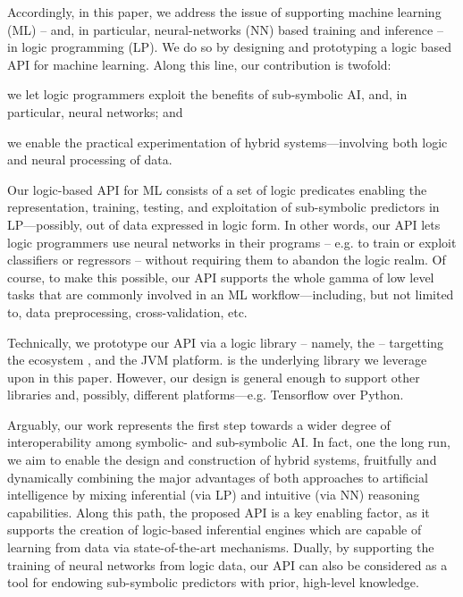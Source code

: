 \documentclass[runningheads]{llncs}
\begin{document}
Accordingly, in this paper, we address the issue of supporting machine learning (ML) -- and, in particular, neural-networks (NN) based training and inference -- in logic programming (LP).
%
We do so by designing and prototyping a logic based API for machine learning.
%
Along this line, our contribution is twofold:
%
\begin{inlinelist}
    \item we let logic programmers exploit the benefits of sub-symbolic AI, and, in particular, neural networks; and
    \item we enable the practical experimentation of hybrid systems---involving both logic and neural processing of data.
\end{inlinelist}

Our logic-based API for ML consists of a set of logic predicates enabling the representation, training, testing, and exploitation of sub-symbolic predictors in LP---possibly, out of data expressed in logic form.
%
In other words, our API lets logic programmers use neural networks in their programs -- e.g. to train or exploit classifiers or regressors -- without requiring them to abandon the logic realm.
%
Of course, to make this possible, our API supports the whole gamma of low level tasks that are commonly involved in an ML workflow---including, but not limited to, data preprocessing, cross-validation, etc.

Technically, we prototype our API via a logic library -- namely, the \mllib{} -- targetting the \twopkt{} ecosystem \cite{2p-kt}, and the JVM platform.
%
\deeplearningforj{} \cite{DL4J} is the underlying library we leverage upon in this paper.
%
However, our design is general enough to support other libraries and, possibly, different platforms---e.g. Tensorflow \cite{tensorflow2015-whitepaper} over Python.

Arguably, our work represents the first step towards a wider degree of interoperability among symbolic- and sub-symbolic AI.
%
In fact, one the long run, we aim to enable the design and construction of hybrid systems, fruitfully and dynamically combining the major advantages of both approaches to artificial intelligence by mixing inferential (via LP) and intuitive (via NN) reasoning capabilities.
%
Along this path, the proposed API is a key enabling factor, as it supports the creation of logic-based inferential engines which are capable of learning from data via state-of-the-art mechanisms.
%
Dually, by supporting the training of neural networks from logic data, our API can also be considered as a tool for endowing sub-symbolic predictors with prior, high-level knowledge.
\end{document}
